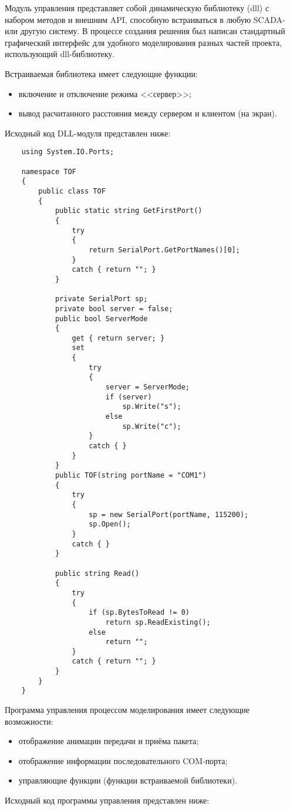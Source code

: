Модуль управления представляет собой динамическую библиотеку (dll) с набором методов и внешним API, способную встраиваться в любую SCADA- или другую систему. В процессе создания решения был написан стандартный графический интерфейс для удобного моделирования разных частей проекта, использующий dll-библиотеку.

Встраиваемая библиотека имеет следующие функции:

\begin{itemize}
    \item включение и отключение режима <<сервер>>;
    \item вывод расчитанного расстояния между сервером и клиентом (на экран).
\end{itemize}

Исходный код DLL-модуля представлен ниже:

\begin{verbatim}
    using System.IO.Ports;

    namespace TOF
    {
        public class TOF
        {
            public static string GetFirstPort()
            {
                try
                {
                    return SerialPort.GetPortNames()[0];
                }
                catch { return ""; }
            }

            private SerialPort sp;
            private bool server = false;
            public bool ServerMode
            {
                get { return server; }
                set
                {
                    try
                    {
                        server = ServerMode;
                        if (server)
                            sp.Write("s");
                        else
                            sp.Write("c");
                    }
                    catch { }
                }
            }
            public TOF(string portName = "COM1")
            {
                try
                {
                    sp = new SerialPort(portName, 115200);
                    sp.Open();
                }
                catch { }
            }

            public string Read()
            {
                try
                {
                    if (sp.BytesToRead != 0)
                        return sp.ReadExisting();
                    else
                        return "";
                }
                catch { return ""; }
            }
        }
    }
\end{verbatim}

Программа управления процессом моделирования имеет следующие возможности:

\begin{itemize}
    \item отображение анимации передачи и приёма пакета;
    \item отображение информации последовательного COM-порта;
    \item управляющие функции (функции встраиваемой библиотеки).
\end{itemize}

Исходный код программы управления представлен ниже:


